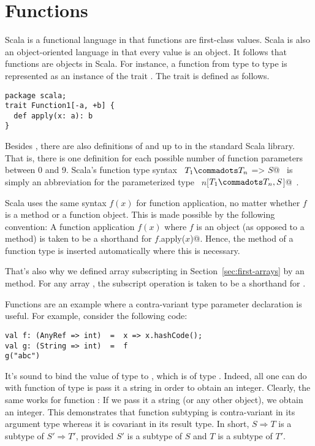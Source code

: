 \documentclass[a4paper,12pt,twoside,titlepage]{book}
\begin{document}
\section{Functions}

Scala is a functional language in that functions are first-class
values.  Scala is also an object-oriented language in that every value
is an object.  It follows that functions are objects in Scala.  For
instance, a function from type  to type  is
represented as an instance of the trait .
The  trait is defined as follows.
\begin{lstlisting}
package scala;
trait Function1[-a, +b] {
  def apply(x: a): b
}
\end{lstlisting}
Besides , there are also definitions of
 and  up to  in the
standard Scala library. That is, there is one definition for each
possible number of function parameters between 0 and 9.  Scala's
function type syntax ~\lstinline@$T_1 \commadots T_n$ => $S$@~ is
simply an abbreviation for the parameterized type
~\lstinline@Function$n$[$T_1 \commadots T_n, S$]@~.

Scala uses the same syntax $f(x)$ for function application, no matter
whether $f$ is a method or a function object. This is made possible by
the following convention: A function application $f(x)$ where $f$ is
an object (as opposed to a method) is taken to be a shorthand for
\lstinline@$f$.apply($x$)@. Hence, the  method of a
function type is inserted automatically where this is necessary.

That's also why we defined array subscripting in
Section~\ref{sec:first-arrays} by an  method.  For any
array , the subscript operation  is taken to be a
shorthand for .

Functions are an example where a contra-variant type parameter
declaration is useful. For example, consider the following code:
\begin{lstlisting} 
val f: (AnyRef => int)  =  x => x.hashCode();
val g: (String => int)  =  f
g("abc")
\end{lstlisting}
It's sound to bind the value  of type  to
, which is of type . Indeed, all one can
do with function of type  is pass it a string in
order to obtain an integer. Clearly, the same works for function
: If we pass it a string (or any other object), we obtain an
integer.  This demonstrates that function subtyping is contra-variant
in its argument type whereas it is covariant in its result type.
In short, $S \Rightarrow T$ is a subtype of $S' \Rightarrow T'$, provided
$S'$ is a subtype of $S$ and $T$ is a subtype of $T'$.
\end{document}
